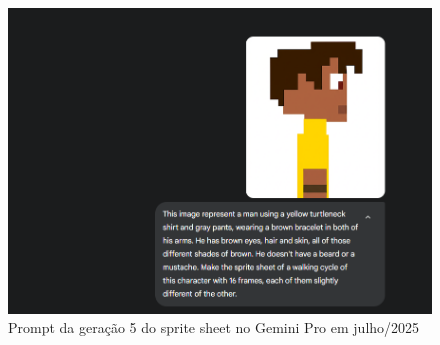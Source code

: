 \begin{figure}[htbp]
\end{figure}

\begin{figure}[htbp]
    \centering
    \caption{\small Prompt da geração 5 do sprite sheet no Gemini Pro em julho/2025}
    \label{fig:geminiProSheet5Prompt}
        \includegraphics[width=0.8\linewidth]{figs/geminiPro/chat10/tela1.PNG}
\end{figure}


